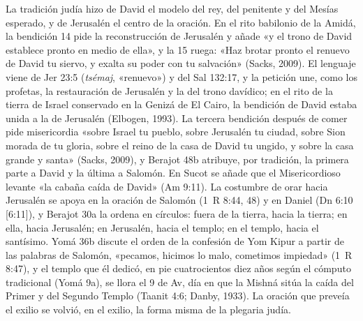 \documentclass[11pt,letterpaper]{article}
\begin{document}
La tradición judía hizo de David el modelo del rey, del penitente y del Mesías esperado, y de Jerusalén el centro de la oración. En el rito babilonio de la Amidá, la bendición 14 pide la reconstrucción de Jerusalén y añade «y el trono de David establece pronto en medio de ella», y la 15 ruega: «Haz brotar pronto el renuevo de David tu siervo, y exalta su poder con tu salvación» (Sacks, 2009). El lenguaje viene de Jer 23:5 (\emph{tsémaj}, «renuevo») y del Sal 132:17, y la petición une, como los profetas, la restauración de Jerusalén y la del trono davídico; en el rito de la tierra de Israel conservado en la Genizá de El Cairo, la bendición de David estaba unida a la de Jerusalén (Elbogen, 1993). La tercera bendición después de comer pide misericordia «sobre Israel tu pueblo, sobre Jerusalén tu ciudad, sobre Sion morada de tu gloria, sobre el reino de la casa de David tu ungido, y sobre la casa grande y santa» (Sacks, 2009), y Berajot 48b atribuye, por tradición, la primera parte a David y la última a Salomón. En Sucot se añade que el Misericordioso levante «la cabaña caída de David» (Am 9:11). La costumbre de orar hacia Jerusalén se apoya en la oración de Salomón (1~R 8:44, 48) y en Daniel (Dn 6:10 [6:11]), y Berajot 30a la ordena en círculos: fuera de la tierra, hacia la tierra; en ella, hacia Jerusalén; en Jerusalén, hacia el templo; en el templo, hacia el santísimo. Yomá 36b discute el orden de la confesión de Yom Kipur a partir de las palabras de Salomón, «pecamos, hicimos lo malo, cometimos impiedad» (1~R 8:47), y el templo que él dedicó, en pie cuatrocientos diez años según el cómputo tradicional (Yomá 9a), se llora el 9 de Av, día en que la Mishná sitúa la caída del Primer y del Segundo Templo (Taanit 4:6; Danby, 1933). La oración que preveía el exilio se volvió, en el exilio, la forma misma de la plegaria judía.
\end{document}
